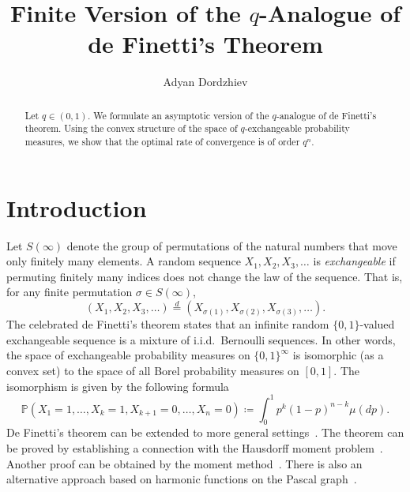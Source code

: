 \documentclass[12pt, a4paper]{amsart}
\title{Finite Version of the $q$-Analogue of de Finetti's Theorem}
\author[A.\,Dordzhiev]{Adyan Dordzhiev}
\numberwithin{equation}{subsection}
\theoremstyle{definition}
\begin{document}
 
\begin{abstract}
Let $q \in (0,1)$. We formulate an asymptotic version of the $q$-analogue of de Finetti's theorem. Using the convex structure of the space of $q$-exchangeable probability measures, we show that the optimal rate of convergence is of order $q^n$.
\end{abstract}
\maketitle
\tableofcontents


\section{Introduction}
\noindent Let \( S(\infty) \) denote the group of permutations of the natural numbers that move only finitely many elements. A random sequence \( X_1, X_2, X_3, \ldots \) is \textit{exchangeable} if permuting finitely many indices does not change the law of the sequence. That is, for any finite permutation \( \sigma \in S(\infty) \),
\[
(X_1, X_2, X_3, \ldots) \overset{d}{=} (X_{\sigma(1)}, X_{\sigma(2)}, X_{\sigma(3)}, \ldots).
\] The celebrated de Finetti's theorem states that an infinite random $\{0,1\}$-valued  exchangeable sequence is a mixture of i.i.d.\ Bernoulli sequences. In other words, the space of exchangeable probability measures on \( \{0,1\}^\infty \) is isomorphic (as a convex set) to the space of all Borel probability measures on \( [0,1] \). The isomorphism is given by the following formula
\begin{equation}
\label{classicalversion}
\mathbb{P} (X_{1} = 1, \ldots, X_{k} = 1, X_{k+1} = 0, \ldots, X_{n} = 0) \coloneqq \int_{0}^{1} p^{k} (1-p)^{n-k} \mu(dp).
\end{equation}
De Finetti's theorem can be extended to more general settings~\cite{f8ab7edc-b800-37cb-843f-446c06ee989b}. The theorem can be proved by establishing a connection with the Hausdorff moment problem~\cite{feller1971introduction}. Another proof can be obtained by the moment method~\cite{kirsch2018elementaryprooffinettistheorem}. There is also an alternative approach based on harmonic functions on the Pascal graph~\cite{Borodin_Olshanski_2016}.
\end{document}

